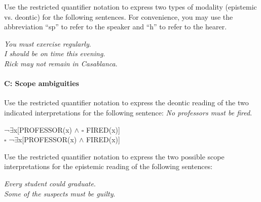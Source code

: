 Use the restricted quantifier notation to express two types of modality (epistemic vs. deontic) for the following sentences. For convenience, you may use the abbreviation “sp” to refer to the speaker and “h” to refer to the hearer.

\ea
\ea
\textit{You must exercise regularly}.\\
\ex \textit{I should be on time this evening}.\\
\ex \textit{Rick may not remain in Casablanca}.
\z
\z

\paragraph{C: Scope ambiguities}
\begin{exe}
 \ex \begin{xlisti}
  \ex Use the restricted quantifier notation to express the deontic reading of the two indicated interpretations for the following sentence: 
  \textit{No professors must be fired}.\\
  \begin{xlisti}
    \ex ¬${\exists}$x[PROFESSOR(x) $\wedge$ ${\square}$ FIRED(x)]\\
    \ex ${\square}$ ¬${\exists}$x[PROFESSOR(x) $\wedge$ FIRED(x)]
  \end{xlisti}
\ex  Use the restricted quantifier notation to express the two possible scope interpretations for the epistemic reading of the following sentences:\\
\begin{xlista}
 \ex \textit{Every student could graduate}.\\
 \ex \textit{Some of the suspects must be guilty}.
\end{xlista}
\end{xlisti}
\end{exe}
